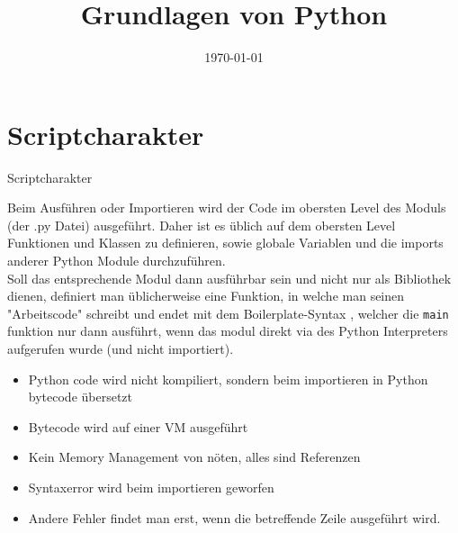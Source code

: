

\usepackage{comment}

\newcommand{\topic}{
	Grundlagen von Python
}

\title{\topic}
\supertitle{\course}
\date{\today}



\maketitle

\begin{frame}
	\tableofcontents
\end{frame}



\section{Scriptcharakter}
\begin{frame}[fragile]{Scriptcharakter}

Beim Ausführen oder Importieren wird der Code im obersten Level des Moduls (der .py Datei) ausgeführt. Daher ist es üblich auf dem obersten Level Funktionen und Klassen zu definieren, sowie globale Variablen und die imports anderer Python Module durchzuführen. \\
Soll das entsprechende Modul dann ausführbar sein und nicht nur als Bibliothek dienen, definiert man üblicherweise eine  Funktion, in welche man seinen
"Arbeitscode" schreibt und endet mit dem Boilerplate-Syntax , welcher die \texttt{main} funktion nur dann ausführt, wenn das modul direkt via des Python Interpreters aufgerufen wurde (und nicht importiert).\\

\begin{itemize}
	\item Python code wird nicht kompiliert, sondern beim importieren in Python bytecode übersetzt
	\item Bytecode wird auf einer VM ausgeführt
	\item Kein Memory Management von nöten, alles sind Referenzen
	\item Syntaxerror wird beim importieren geworfen
	\item Andere Fehler findet man erst, wenn die betreffende Zeile ausgeführt wird.
\end{itemize}


\end{frame}
	
